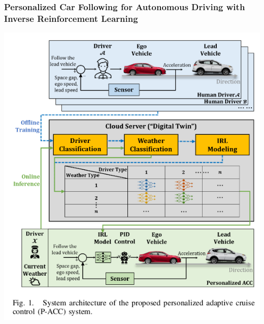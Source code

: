 \begin{frame}
    \frametitle{Personalized Car Following for Autonomous Driving with Inverse Reinforcement Learning \cite{zhao_personalized_2022}}

    \begin{center}
        \includegraphics[width=0.35\linewidth]{content/images/personalized_car.png}
    \end{center}
\end{frame}